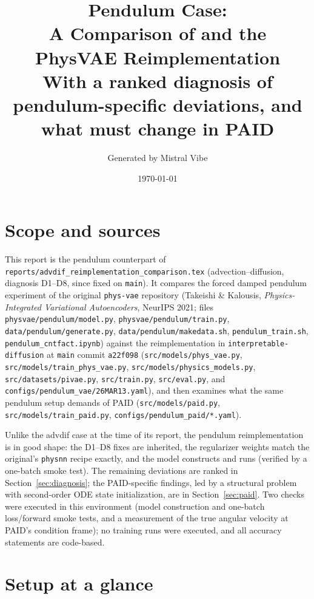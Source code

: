 \documentclass[11pt,a4paper]{article}
\title{Pendulum Case:\\
A Comparison of \code{phys-vae} and the \code{interpretable-diffusion} PhysVAE Reimplementation\\
\large With a ranked diagnosis of pendulum-specific deviations, and what must change in PAID}
\author{Generated by Mistral Vibe}
\date{\today}
\newcommand{\code}[1]{\texttt{#1}}
\begin{document}
\maketitle

\section*{Scope and sources}

This report is the pendulum counterpart of
\code{reports/advdif\_reimplementation\_comparison.tex} (advection--diffusion,
diagnosis D1--D8, since fixed on \code{main}). It compares the forced damped
pendulum experiment of the original \code{phys-vae} repository
(Takeishi \& Kalousis, \emph{Physics-Integrated Variational Autoencoders},
NeurIPS 2021; files \code{physvae/pendulum/model.py},
\code{physvae/pendulum/train.py}, \code{data/pendulum/generate.py},
\code{data/pendulum/makedata.sh}, \code{pendulum\_train.sh},
\code{pendulum\_cntfact.ipynb}) against the reimplementation in
\code{interpretable-diffusion} at \code{main} commit \code{a22f098}
(\code{src/models/phys\_vae.py}, \code{src/models/train\_phys\_vae.py},
\code{src/models/physics\_models.py}, \code{src/datasets/pivae.py},
\code{src/train.py}, \code{src/eval.py}, and
\code{configs/pendulum\_vae/26MAR13.yaml}), and then examines what the same
pendulum setup demands of PAID (\code{src/models/paid.py},
\code{src/models/train\_paid.py}, \code{configs/pendulum\_paid/*.yaml}).

Unlike the advdif case at the time of its report, the pendulum reimplementation
is in good shape: the D1--D8 fixes are inherited, the regularizer weights match
the original's \code{physnn} recipe exactly, and the model constructs and runs
(verified by a one-batch smoke test). The remaining deviations are ranked in
Section~\ref{sec:diagnosis}; the PAID-specific findings, led by a structural
problem with second-order ODE state initialization, are in
Section~\ref{sec:paid}. Two checks were executed in this environment (model
construction and one-batch loss/forward smoke tests, and a measurement of the
true angular velocity at PAID's condition frame); no training runs were
executed, and all accuracy statements are code-based.

\section{Setup at a glance}
\end{document}
